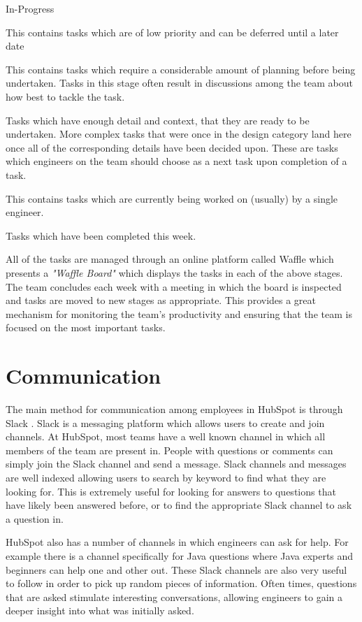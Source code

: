 \begin{labeling}{In-Progress}
	\item [Backlog] This contains tasks which are of low priority and can be deferred until a later date
	\item [Design] This contains tasks which require a considerable amount of planning before being undertaken. Tasks in this stage often result in discussions among the team about how best to tackle the task.
	\item [Ready] Tasks which have enough detail and context, that they are ready to be undertaken. More complex tasks that were once in the design category land here once all of the corresponding details have been decided upon. These are tasks which engineers on the team should choose as a next task upon completion of a task.
	\item [In-Progress] This contains tasks which are currently being worked on (usually) by a single engineer.
	\item [Completed] Tasks which have been completed this week.
\end{labeling}

All of the tasks are managed through an online platform called Waffle \cite{waffle} which presents a \textit{"Waffle Board"} which displays the tasks in each of the above stages. The team concludes each week with a meeting in which the board is inspected and tasks are moved to new stages as appropriate. This provides a great mechanism for monitoring the team's productivity and ensuring that the team is focused on the most important tasks. 

\section{Communication}
The main method for communication among employees in HubSpot is through Slack \cite{slack}. Slack is a messaging platform which allows users to create and join channels. At HubSpot, most teams have a well known channel in which all members of the team are present in. People with questions or comments can simply join the Slack channel and send a message. Slack channels and messages are well indexed allowing users to search by keyword to find what they are looking for. This is extremely useful for looking for answers to questions that have likely been answered before, or to find the appropriate Slack channel to ask a question in.

HubSpot also has a number of channels in which engineers can ask for help. For example there is a channel specifically for Java questions where Java experts and beginners can help one and other out. These Slack channels are also very useful to follow in order to pick up random pieces of information. Often times, questions that are asked stimulate interesting conversations, allowing engineers to gain a deeper insight into what was initially asked.

